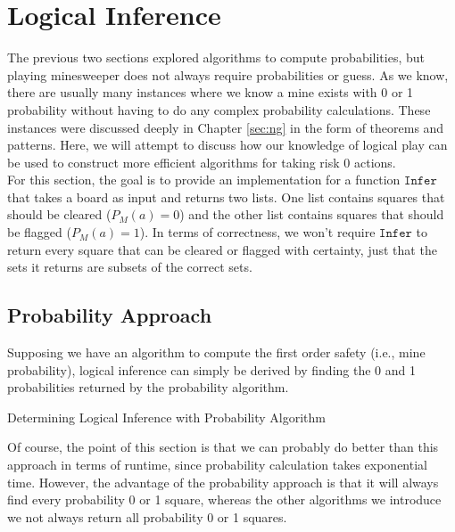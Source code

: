 \section{Logical Inference}
The previous two sections explored algorithms to compute probabilities, but playing minesweeper does not always require probabilities or guess. As we know, there are usually many instances where we know a mine exists with 0 or 1 probability without having to do any complex probability calculations. These instances were discussed deeply in Chapter \ref{sec:ng} in the form of theorems and patterns. Here, we will attempt to discuss how our knowledge of logical play can be used to construct more efficient algorithms for taking risk 0 actions.\\

For this section, the goal is to provide an implementation for a function $\texttt{Infer}$ that takes a board as input and returns two lists. One list contains squares that should be cleared ($P_M(a)=0$) and the other list contains squares that should be flagged ($P_M(a)=1$). In terms of correctness, we won't require $\texttt{Infer}$ to return every square that can be cleared or flagged with certainty, just that the sets it returns are subsets of the correct sets.\\

\subsection{Probability Approach}
Supposing we have an algorithm to compute the first order safety (i.e., mine probability), logical inference can simply be derived by finding the 0 and 1 probabilities returned by the probability algorithm.

\begin{algorithm}[h]
\caption*{Determining Logical Inference with Probability Algorithm}
\begin{algorithmic}
    \EndIf
\EndFor
{}
\EndFunction
\end{algorithmic}
\end{algorithm}

Of course, the point of this section is that we can probably do better than this approach in terms of runtime, since probability calculation takes exponential time. However, the advantage of the probability approach is that it will always find every probability 0 or 1 square, whereas the other algorithms we introduce we not always return all probability 0 or 1 squares.\\

